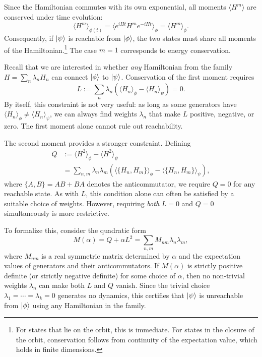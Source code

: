 \documentclass[aps,prx,reprint,superscriptaddress,footnote, twocolumn,notitlepage]{revtex4-2}
\begin{document}
Since the Hamiltonian commutes with its own exponential, all moments $\langle H^m \rangle$ are conserved under time evolution:
\begin{equation}
    \langle H^m \rangle_{\phi(t)} = \langle e^{iHt} H^m e^{-iHt} \rangle_\phi = \langle H^m \rangle_\phi.
\end{equation}
Consequently, if $\ket{\psi}$ is reachable from $\ket{\phi}$, the two states must share all moments of the Hamiltonian.\footnote{For states that lie on the orbit, this is immediate. For states in the closure of the orbit, conservation follows from continuity of the expectation value, which holds in finite dimensions.} The case $m=1$ corresponds to energy conservation.

Recall that we are interested in whether \emph{any} Hamiltonian from the family $H = \sum_n \lambda_n H_n$ can connect $\ket{\phi}$ to $\ket{\psi}$. Conservation of the first moment requires
\begin{equation}
    L := \sum_n \lambda_n \left( \langle H_n \rangle_\phi - \langle H_n \rangle_\psi \right) = 0.
\end{equation}
By itself, this constraint is not very useful: as long as some generators have $\langle H_n \rangle_\phi \neq \langle H_n \rangle_\psi$, we can always find weights $\lambda_n$ that make $L$ positive, negative, or zero. The first moment alone cannot rule out reachability.

The second moment provides a stronger constraint. Defining
\begin{equation}\begin{aligned}
    Q &:= \langle H^2 \rangle_\phi - \langle H^2 \rangle_\psi \\
    &= \sum_{n,m} \lambda_n \lambda_m \left( \langle \{H_n, H_m\} \rangle_\phi - \langle \{H_n, H_m\} \rangle_\psi \right),
    \end{aligned}
\end{equation}
where $\{A, B\} = AB + BA$ denotes the anticommutator, we require $Q = 0$ for any reachable state. As with $L$, this condition alone can often be satisfied by a suitable choice of weights. However, requiring \emph{both} $L = 0$ and $Q = 0$ simultaneously is more restrictive.

To formalize this, consider the quadratic form
\begin{equation}
    M(\alpha) = Q + \alpha L^2 = \sum_{n,m} M_{nm} \lambda_n \lambda_m,
\end{equation}
where $M_{nm}$ is a real symmetric matrix determined by $\alpha$ and the expectation values of generators and their anticommutators. If $M(\alpha)$ is strictly positive definite (or strictly negative definite) for some choice of $\alpha$, then no non-trivial weights $\lambda_n$ can make both $L$ and $Q$ vanish. Since the trivial choice $\lambda_1 = \cdots = \lambda_k = 0$ generates no dynamics, this certifies that $\ket{\psi}$ is unreachable from $\ket{\phi}$ using any Hamiltonian in the family.
\end{document}
